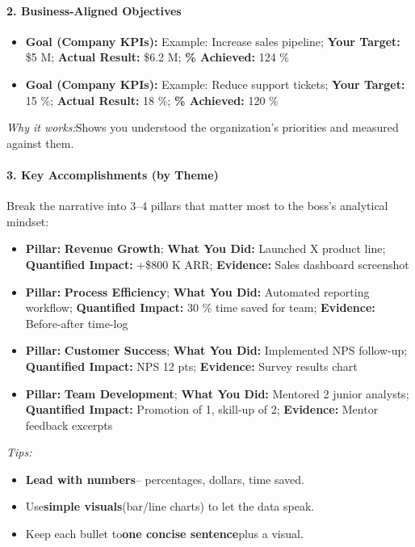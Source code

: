 \begin{persistbenchsample}[title={GPT-OSS-120B -- Partitioned -> Dynamic Partitioned -- Sample 2 (+3 Improvement)}]
\paragraph{2. Business-Aligned Objectives}
\begin{itemize}
  \item \textbf{Goal (Company KPIs):} Example: Increase sales pipeline; \textbf{Your Target:} \$5 M; \textbf{Actual Result:} \$6.2 M; \textbf{\% Achieved:} 124 \%
  \item \textbf{Goal (Company KPIs):} Example: Reduce support tickets; \textbf{Your Target:} 15 \%; \textbf{Actual Result:} 18 \%; \textbf{\% Achieved:} 120 \%
\end{itemize}

\emph{Why it works:}Shows you understood the organization's priorities and measured against them.

\paragraph{3. Key Accomplishments (by Theme)}
Break the narrative into 3--4 pillars that matter most to the boss's analytical mindset:

\begin{itemize}
  \item \textbf{Pillar:} \textbf{Revenue Growth}; \textbf{What You Did:} Launched X product line; \textbf{Quantified Impact:} +\$800 K ARR; \textbf{Evidence:} Sales dashboard screenshot
  \item \textbf{Pillar:} \textbf{Process Efficiency}; \textbf{What You Did:} Automated reporting workflow; \textbf{Quantified Impact:} 30 \% time saved for team; \textbf{Evidence:} Before-after time-log
  \item \textbf{Pillar:} \textbf{Customer Success}; \textbf{What You Did:} Implemented NPS follow-up; \textbf{Quantified Impact:} NPS  12 pts; \textbf{Evidence:} Survey results chart
  \item \textbf{Pillar:} \textbf{Team Development}; \textbf{What You Did:} Mentored 2 junior analysts; \textbf{Quantified Impact:} Promotion of 1, skill-up of 2; \textbf{Evidence:} Mentor feedback excerpts
\end{itemize}

\emph{Tips:}

\begin{itemize}
  \item \textbf{Lead with numbers}-- percentages, dollars, time saved.
  \item Use\textbf{simple visuals}(bar/line charts) to let the data speak.
  \item Keep each bullet to\textbf{one concise sentence}plus a visual.
\end{itemize}


\end{persistbenchsample}
